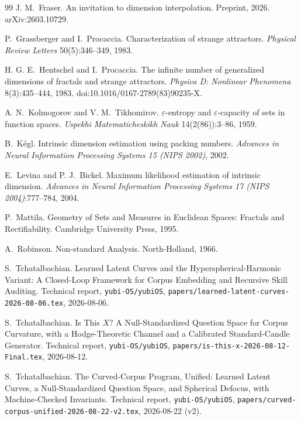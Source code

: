 \documentclass[11pt,a4paper]{article}
\theoremstyle{plain}
\theoremstyle{remark}
\begin{document}
\begin{thebibliography}{99}
 J. M.~Fraser. An invitation to dimension interpolation. Preprint, 2026. arXiv:2603.10729.

 P.~Grassberger and I.~Procaccia. Characterization of strange attractors. \emph{Physical Review Letters} 50(5):346--349, 1983.

 H. G. E.~Hentschel and I.~Procaccia. The infinite number of generalized dimensions of fractals and strange attractors. \emph{Physica D: Nonlinear Phenomena} 8(3):435--444, 1983. doi:10.1016/0167-2789(83)90235-X.

 A. N.~Kolmogorov and V. M.~Tikhomirov. $\varepsilon$-entropy and $\varepsilon$-capacity of sets in function spaces. \emph{Uspekhi Matematicheskikh Nauk} 14(2(86)):3--86, 1959.

 B.~K\'egl. Intrinsic dimension estimation using packing numbers. \emph{Advances in Neural Information Processing Systems 15 (NIPS 2002)}, 2002.

 E.~Levina and P. J.~Bickel. Maximum likelihood estimation of intrinsic dimension. \emph{Advances in Neural Information Processing Systems 17 (NIPS 2004)}:777--784, 2004.

 P.~Mattila. Geometry of Sets and Measures in {E}uclidean Spaces: Fractals and Rectifiability. Cambridge University Press, 1995.

 A.~Robinson. Non-standard Analysis. North-Holland, 1966.

 S.~Tchatalbachian. Learned Latent Curves and the Hyperspherical-Harmonic Variant: A Closed-Loop Framework for Corpus Embedding and Recursive Skill Auditing. Technical report, \texttt{yubi-OS/yubiOS}, \texttt{papers/learned-latent-curves-2026-08-06.tex}, 2026-08-06.

 S.~Tchatalbachian. Is This $X$? A Null-Standardized Question Space for Corpus Curvature, with a Hodge-Theoretic Channel and a Calibrated Standard-Candle Generator. Technical report, \texttt{yubi-OS/yubiOS}, \texttt{papers/is-this-x-2026-08-12-Final.tex}, 2026-08-12.

 S.~Tchatalbachian. The Curved-Corpus Program, Unified: Learned Latent Curves, a Null-Standardized Question Space, and Spherical Defocus, with Machine-Checked Invariants. Technical report, \texttt{yubi-OS/yubiOS}, \texttt{papers/curved-corpus-unified-2026-08-22-v2.tex}, 2026-08-22 (v2).


\end{thebibliography}
\end{document}
